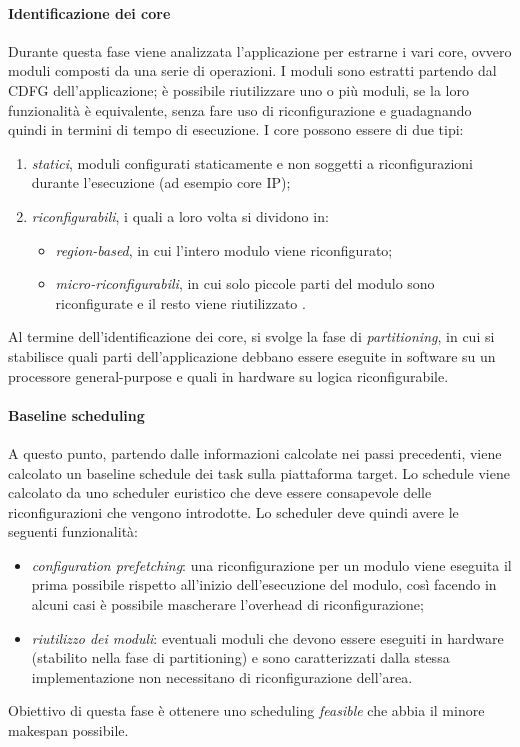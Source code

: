 \paragraph{Identificazione dei core}
Durante questa fase viene analizzata l'applicazione per estrarne i vari core, 
ovvero moduli composti da una serie di operazioni. I moduli sono estratti 
partendo dal \ac{CDFG} dell'applicazione; è possibile 
riutilizzare uno o più moduli, se la loro funzionalit\`a \`e equivalente,
senza fare uso di riconfigurazione e guadagnando 
quindi in termini di tempo di esecuzione.
I core possono essere di due tipi:
\begin{enumerate}
 \item \emph{statici}, moduli configurati staticamente e non soggetti a
   riconfigurazioni durante l'esecuzione (ad esempio core IP);
 \item \emph{riconfigurabili}, i quali a loro volta si dividono in:
  \begin{itemize}
   \item \emph{region-based}, in cui l'intero modulo viene riconfigurato;
   \item \emph{micro-riconfigurabili}, in cui solo piccole parti del modulo 
     sono riconfigurate e il resto viene riutilizzato \cite{FPGAReconfigurationGhent}.
  \end{itemize}
\end{enumerate}

Al termine dell'identificazione dei core, si svolge la fase di 
\emph{partitioning}, in cui si stabilisce quali parti dell'applicazione debbano 
essere eseguite in software su un processore general-purpose e quali in 
hardware su logica riconfigurabile.

\paragraph{Baseline scheduling}
A questo punto, partendo dalle informazioni calcolate nei passi precedenti, 
viene calcolato un baseline schedule dei task sulla piattaforma target. Lo 
schedule viene calcolato da uno scheduler euristico che deve essere consapevole
delle riconfigurazioni che vengono introdotte. Lo scheduler deve quindi 
avere le seguenti funzionalità:
\begin{itemize}
 \item \emph{configuration prefetching}: una riconfigurazione per un 
modulo viene eseguita il prima possibile rispetto all'inizio dell'esecuzione 
del modulo, così facendo in alcuni casi è possibile mascherare l'overhead di 
riconfigurazione;
 \item \emph{riutilizzo dei moduli}: eventuali moduli che devono 
essere eseguiti in hardware (stabilito nella fase di partitioning) e sono 
caratterizzati dalla stessa implementazione non necessitano di riconfigurazione 
dell'area.
\end{itemize}
Obiettivo di questa fase è ottenere uno scheduling \emph{feasible} che abbia il 
minore makespan possibile.

